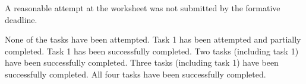 \documentclass{../../../fal_assignment}
\begin{document}
\begin{markingrubric}
		\grade\fail	A reasonable attempt at the worksheet was not submitted by the formative deadline.
		
        \grade\fail None of the tasks have been attempted.
		\grade Task 1 has been attempted and partially completed.
		\grade Task 1 has been successfully completed.
		\grade Two tasks (including task 1) have been successfully completed.
		\grade Three tasks (including task 1) have been successfully completed.
		\grade All four tasks have been successfully completed.


\end{markingrubric}
\end{document}
